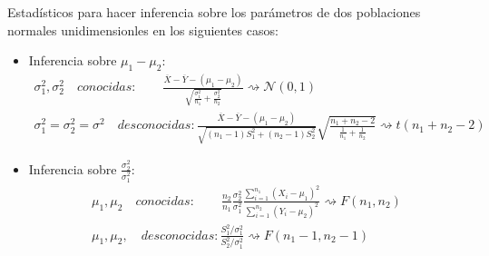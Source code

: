 \documentclass{article}
\begin{document}
Estadísticos para hacer inferencia sobre los parámetros de dos poblaciones normales unidimensionles en los siguientes casos:
\begin{itemize}
\item Inferencia sobre $\mu_1-\mu_2$:
	\begin{gather*}
	\sigma_1^2,\sigma_2^2\quad conocidas:\qquad \frac{\overline{X}-\overline{Y}-(\mu_1-\mu_2)}{\sqrt{\frac{\sigma_1^2}{n_1}+\frac{\sigma_2^2}{n_2}}}\rightsquigarrow \mathcal{N}(0,1)\\
	\sigma_1^2=\sigma_2^2=\sigma^2\quad desconocidas: \frac{\overline{X}-\overline{Y}-(\mu_1-\mu_2)}{\sqrt{(n_1-1)S_1^2+(n_2-1)S_2^2}}\sqrt{\frac{n_1+n_2-2}{\frac{1}{n_1}+\frac{1}{n_2}}}\rightsquigarrow t(n_1+n_2-2)
	\end{gather*}
	
\item Inferencia sobre $\frac{\sigma_2^2}{\sigma_1^2}$:
	\begin{gather*}
	\mu_1,\mu_2\quad conocidas:\qquad \frac{n_2}{n_1}\frac{\sigma_2^2}{\sigma_1^2}\frac{\sum_{i=1}^{n_1}(X_i-\mu_1)^2}{\sum_{i=1}^{n_2}(Y_i-\mu_2)^2}\rightsquigarrow F(n_1,n_2)\\
	\mu_1,\mu_2,\quad desconocidas: \frac{S_1^2/\sigma_1^2}{S_2^2/\sigma_1^2}\rightsquigarrow F(n_1-1,n_2-1)
	\end{gather*}
\end{itemize}
\end{document}
